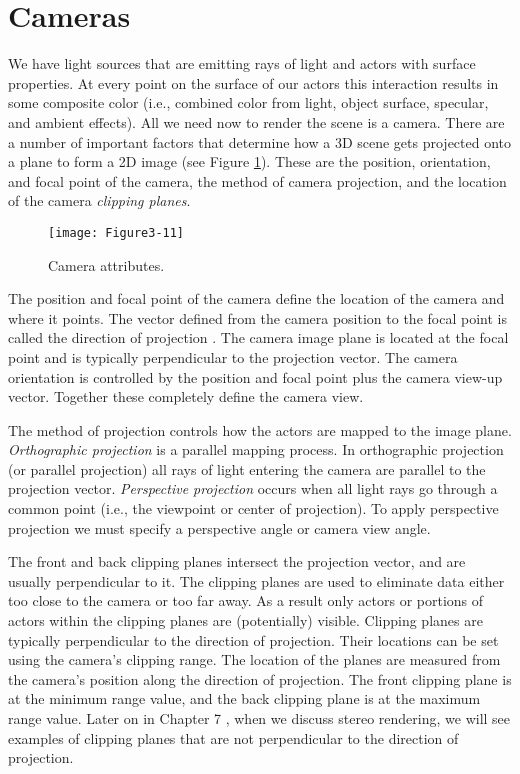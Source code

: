 \section{Cameras}
\label{sec:cameras}

We have light sources that are emitting rays of light and actors with surface properties. At every point on the surface of our actors this interaction results in some composite color (i.e., combined color from light, object surface, specular, and ambient effects). All we need now to render the scene is a camera. There are a number of important factors that determine how a 3D scene gets projected onto a plane to form a 2D image (see Figure \ref{fig:Figure3-11}). These are the position, orientation, and focal point of the camera, the method of camera projection, and the location of the camera \emph{clipping planes}.

\begin{figure}[!htb]
  \centering
  \texttt{[image: Figure3-11]}\\
  \caption{Camera attributes.}\label{fig:Figure3-11}
\end{figure}

The position and focal point of the camera define the location of the camera and where it points. The vector defined from the camera position to the focal point is called the direction of projection . The camera image plane is located at the focal point and is typically perpendicular to the projection vector. The camera orientation is controlled by the position and focal point plus the camera view-up vector. Together these completely define the camera view. 

The method of projection controls how the actors are mapped to the image plane. \emph{Orthographic projection} is a parallel mapping process. In orthographic projection (or parallel projection) all rays of light entering the camera are parallel to the projection vector. \emph{Perspective projection} occurs when all light rays go through a common point (i.e., the viewpoint or center of projection). To apply perspective projection we must specify a perspective angle or camera view angle.

The front and back clipping planes intersect the projection vector, and are usually perpendicular to it. The clipping planes are used to eliminate data either too close to the camera or too far away. As a result only actors or portions of actors within the clipping planes are (potentially) visible. Clipping planes are typically perpendicular to the direction of projection. Their locations can be set using the camera's clipping range. The location of the planes are measured from the camera's position along the direction of projection. The front clipping plane is at the minimum range value, and the back clipping plane is at the maximum range value. Later on in Chapter 7 , when we discuss stereo rendering, we will see examples of clipping planes that are not perpendicular to the direction of projection.

